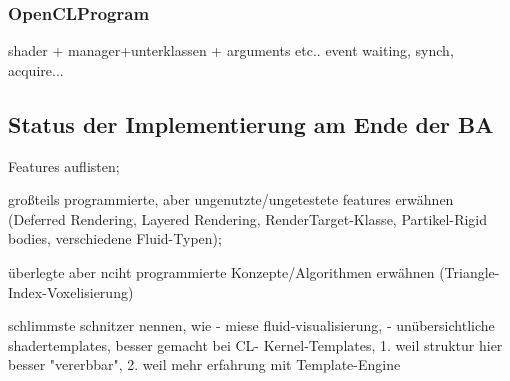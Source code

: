 	\subsubsection{OpenCLProgram}
		shader + manager+unterklassen + arguments etc.. event waiting, synch, acquire...
		
		\label{sec:CLKernelArguments}





\subsection{Status der Implementierung am Ende der BA}
\label{sec:statusImplementation}
	
	Features auflisten;

	großteils programmierte, aber ungenutzte/ungetestete features erwähnen (Deferred Rendering, Layered Rendering, 	
	RenderTarget-Klasse, Partikel-Rigid bodies, verschiedene Fluid-Typen); 


	überlegte aber nciht programmierte Konzepte/Algorithmen erwähnen (Triangle-Index-Voxelisierung)
	
	schlimmste schnitzer nennen, wie
		- miese fluid-visualisierung, 
		- unübersichtliche shadertemplates, besser gemacht bei CL-
			Kernel-Templates, 1. weil struktur hier besser "vererbbar", 2. weil mehr erfahrung mit  Template-Engine
	
	  	
  	

\clearpage
